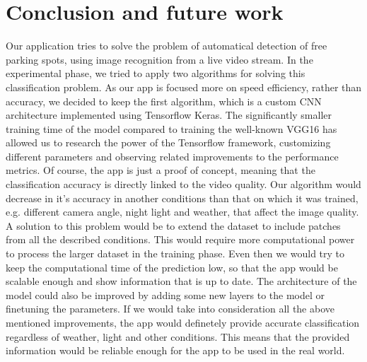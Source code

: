 \documentclass[12pt]{article}
\begin{document}
\section{Conclusion and future work}
Our application tries to solve the problem of automatical detection of free parking spots, using image recognition from a live video stream. In the experimental phase, we tried to apply two algorithms for solving this classification problem. As our app is focused more on speed efficiency, rather than accuracy, we decided to keep the first algorithm, which is a custom CNN architecture implemented using Tensorflow Keras. The significantly smaller training time of the model compared to training the well-known VGG16 has allowed us to research the power of the Tensorflow framework, customizing different parameters and observing related improvements to the performance metrics.
Of course, the app is just a proof of concept, meaning that the classification accuracy is directly linked to the video quality. Our algorithm would decrease in it's accuracy in another conditions than that on which it was trained, e.g. different camera angle, night light and weather, that affect the image quality. A solution to this problem would be to extend the dataset to include patches from all the described conditions. This would require more computational power to process the larger dataset in the training phase. Even then we would try to keep the computational time of the prediction low, so that the app would be scalable enough and show information that is up to date. The architecture of the model could also be improved by adding some new layers to the model or finetuning the parameters.
If we would take into consideration all the above mentioned improvements, the app would definetely provide accurate classification regardless of weather, light and other conditions. This means that the provided information would be reliable enough for the app to be used in the real world.

\clearpage


\end{document}
